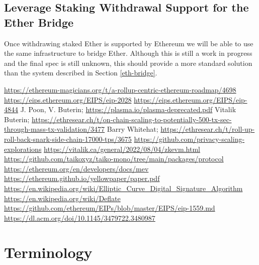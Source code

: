 \documentclass[9pt,oneside]{amsart}
\begin{document}
\begin{multicols}{2}
\subsection{Leverage Staking Withdrawal Support for the Ether Bridge}\label{sec:withdrawals}
Once withdrawing staked Ether is supported by Ethereum we will be able to use the same infrastructure to bridge Ether. Although this is still a work in progress and the final spec is still unknown, this should provide a more standard solution than the system described in Section \ref{eth-bridge}.

\end{multicols}

\begin{thebibliography}{9}
\url{https://ethereum-magicians.org/t/a-rollup-centric-ethereum-roadmap/4698}
\url{https://eips.ethereum.org/EIPS/eip-2028}
\url{https://eips.ethereum.org/EIPS/eip-4844}
J. Poon, V. Buterin; \url{https://plasma.io/plasma-deprecated.pdf}
Vitalik Buterin; \url{https://ethresear.ch/t/on-chain-scaling-to-potentially-500-tx-sec-through-mass-tx-validation/3477}
Barry Whitehat; \url{https://ethresear.ch/t/roll-up-roll-back-snark-side-chain-17000-tps/3675}
\url{https://github.com/privacy-scaling-explorations}
\url{https://vitalik.ca/general/2022/08/04/zkevm.html}
\url{https://github.com/taikoxyz/taiko-mono/tree/main/packages/protocol}
\url{https://ethereum.org/en/developers/docs/mev}
\url{https://ethereum.github.io/yellowpaper/paper.pdf}
\url{https://en.wikipedia.org/wiki/Elliptic_Curve_Digital_Signature_Algorithm}
\url{https://en.wikipedia.org/wiki/Deflate}
\url{https://github.com/ethereum/EIPs/blob/master/EIPS/eip-1559.md}
\url{https://dl.acm.org/doi/10.1145/3479722.3480987}

\end{thebibliography}

\appendix

\section{Terminology} \label{ch:Terminology}
\end{document}
